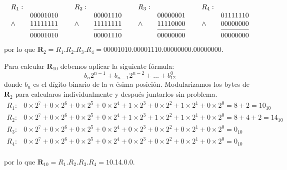 \documentclass[stu, 12pt, letterpaper, donotrepeattitle, floatsintext, natbib]{apa7}
\begin{document}
\[
    \begin{matrix}
        \begin{array}{lr}
           R_1:   & \\
               & 00001010  \\ %
            \land  & 11111111 \\ %
            \cmidrule(lr){2-2}
              & 00001010  \\ %
            \end{array}\,\,
        & 
        \begin{array}{lr}
            R_2:   & \\
               & 00001110  \\
            \land  & 11111111 \\
            \cmidrule(lr){2-2}
              & 00001110  \\
            \end{array}\,\,
        & 
        \begin{array}{lr}
            R_3:   & \\
               & 00000001  \\
            \land  & 11110000 \\
            \cmidrule(lr){2-2}
              & 00000000  \\
            \end{array}\,\,
        & 
        \begin{array}{lr}
            R_4:   & \\
               & 01111110  \\
            \land  & 00000000 \\
            \cmidrule(lr){2-2}
              & 00000000  \\
            \end{array}
        \end{matrix}
\]
por lo que $\textbf{R}_2=R_1$.$R_2$.$R_3$.$R_4=00001010$.$00001110$.$00000000$.$00000000$.\par
\vspace{\baselineskip}
Para calcular $\textbf{R}_{10}$ debemos aplicar la siguiente fórmula:
\[b_n2^{n-1}+b_{n-1}2^{n-2}+\dots+b_12^0\]
donde $b_n$ es el dígito binario de la $n$-ésima posición. Modularizamos los bytes de $\textbf{R}_2$ para
calcularos individualmente y después juntarlos sin problema.
\[\begin{matrix}
    R_1: & 0\times2^7+0\times2^6+0\times2^5+0\times2^4+1\times2^3+0\times2^2+1\times2^1+0\times2^0=8+2=10_{10} \\
    R_2: & 0\times2^7+0\times2^6+0\times2^5+0\times2^4+1\times2^3+1\times2^2+1\times2^1+0\times2^0=8+4+2=14_{10} \\
    R_3: & 0\times2^7+0\times2^6+0\times2^5+0\times2^4+0\times2^3+0\times2^2+0\times2^1+0\times2^0=0_{10}\\
    R_4: & 0\times2^7+0\times2^6+0\times2^5+0\times2^4+0\times2^3+0\times2^2+0\times2^1+0\times2^0=0_{10}\\     
\end{matrix}\]\par
por lo que $\textbf{R}_{10}=R_1$.$R_2$.$R_3$.$R_4=10$.14.0.0.
\vspace{\baselineskip}
\end{document}

